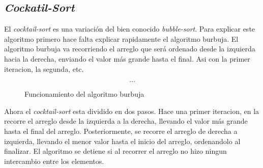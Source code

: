 \documentclass[12pt,twoside]{article}
\begin{document}
\subsection{\textit{Cockatil-Sort}}
El \textit{cocktail-sort} es una variaci\'on del bien conocido \textit{bubble-sort}. Para explicar este algoritmo primero hace falta explicar rapidamente el algoritmo burbuja. El algoritmo burbuja va recorriendo el arreglo que ser\'a ordenado desde la izquierda hacia la derecha, enviando el valor m\'as grande hasta el final. Asi con la primer iteracion, la segunda, etc.
\begin{figure}
    \centering
    \begin{equation}
        [ \longrightarrow 3,0,5,6,7,2]
    \end{equation}
    \begin{equation}
        [3,0,5,6,2,\longrightarrow 7]
    \end{equation}
    \begin{equation}
        \dots
    \end{equation}
    \caption{Funcionamiento del algoritmo burbuja}
    \label{eq:bubble_sort}
\end{figure}
Ahora el \textit{cocktail-sort} esta dividido en dos pasos. Hace una primer iteracion, en la recorre el arreglo desde la izquierda a la derecha, llevando el valor m\'as grande hasta el final del arreglo. Posteriormente, se recorre el arreglo de derecha a izquierda, llevando el menor valor hasta el inicio del arreglo, ordenandolo al finalizar. El algoritmo se detiene si al recorrer el arreglo no hizo ningun intercambio entre los elementos.
\end{document}
